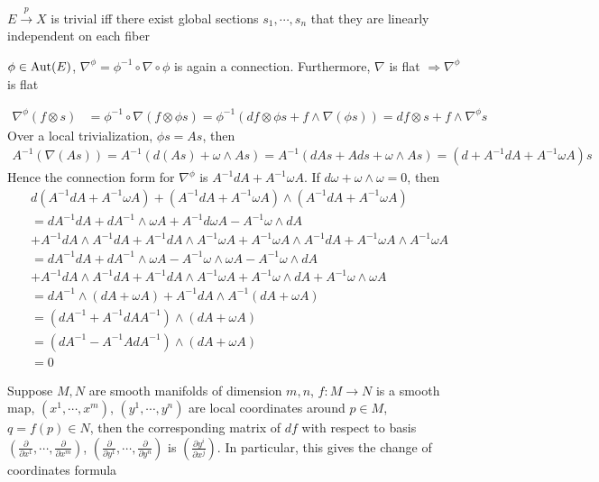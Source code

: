 \documentclass[main]{subfiles}
\begin{document}
\begin{exercise}
$E\overset{p}{\rightarrow}X$ is trivial iff there exist global sections $s_1,\cdots, s_n$ that they are linearly independent on each fiber
\end{exercise}

\begin{exercise}
$\phi\in\operatorname{Aut}(E)$, $\nabla^\phi=\phi^{-1}\circ\nabla\circ\phi$ is again a connection. Furthermore, $\nabla$ is flat $\Rightarrow\nabla^\phi$ is flat
\end{exercise}

\begin{solution}
\begin{align*}
\nabla^\phi(f\otimes s)&=\phi^{-1}\circ\nabla(f\otimes\phi s)=\phi^{-1}(df\otimes \phi s+f\wedge \nabla(\phi s))=df\otimes s+f\wedge\nabla^\phi s
\end{align*}
Over a local trivialization, $\phi s=As$, then
\begin{align*}
A^{-1}(\nabla(As))=A^{-1}(d(As)+\omega\wedge As)=A^{-1}(dAs+Ads+\omega\wedge As)=(d+A^{-1}dA+A^{-1}\omega A)s
\end{align*}
Hence the connection form for $\nabla^\phi$ is $A^{-1}dA+A^{-1}\omega A$. If $d\omega+\omega\wedge\omega=0$, then
\begin{align*}
&d(A^{-1}dA+A^{-1}\omega A)+(A^{-1}dA+A^{-1}\omega A)\wedge(A^{-1}dA+A^{-1}\omega A) \\
&=dA^{-1}dA+dA^{-1}\wedge\omega A+A^{-1}d\omega A-A^{-1}\omega\wedge dA \\
&+A^{-1}dA\wedge A^{-1}dA+A^{-1}dA\wedge A^{-1}\omega A+A^{-1}\omega A\wedge A^{-1}dA+A^{-1}\omega A\wedge A^{-1}\omega A \\
&=dA^{-1}dA+dA^{-1}\wedge\omega A-A^{-1}\omega\wedge\omega A-A^{-1}\omega\wedge dA \\
&+A^{-1}dA\wedge A^{-1}dA+A^{-1}dA\wedge A^{-1}\omega A+A^{-1}\omega\wedge dA+A^{-1}\omega\wedge\omega A \\
&=dA^{-1}\wedge(dA+\omega A)+A^{-1}dA\wedge A^{-1}(dA+\omega A) \\
&=(dA^{-1}+A^{-1}dAA^{-1})\wedge(dA+\omega A) \\
&=(dA^{-1}-A^{-1}AdA^{-1})\wedge(dA+\omega A) \\
&=0
\end{align*}
\end{solution}

\begin{exercise}
Suppose $M,N$ are smooth manifolds of dimension $m,n$, $f:M\to N$ is a smooth map, $(x^1,\cdots,x^m)$, $(y^1,\cdots,y^n)$ are local coordinates around $p\in M$, $q=f(p)\in N$, then the corresponding matrix of $df$ with respect to basis $\left(\frac{\partial}{\partial x^1},\cdots,\frac{\partial}{\partial x^m}\right)$, $\left(\frac{\partial}{\partial y^1},\cdots,\frac{\partial}{\partial y^n}\right)$ is $\left(\frac{\partial y^i}{\partial x^j}\right)$. In particular, this gives the change of coordinates formula
\end{exercise}
\end{document}
